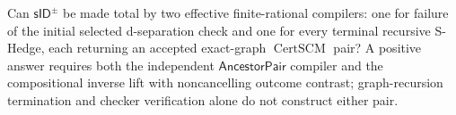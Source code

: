Can \(\mathsf{sID}^{\pm}\) be made total by two effective finite-rational compilers: one for failure of the initial selected d-separation check and one for every terminal recursive S-Hedge, each returning an accepted exact-graph \(\operatorname{CertSCM}\) pair? A positive answer requires both the independent \(\mathsf{AncestorPair}\) compiler and the compositional inverse lift with noncancelling outcome contrast; graph-recursion termination and checker verification alone do not construct either pair.